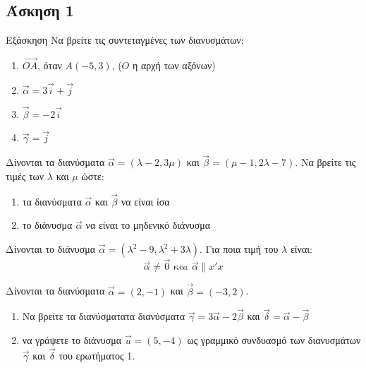 \documentclass{../../presentation}
\begin{document}
\subsection{Άσκηση 1}
\begin{frame}[label=Άσκηση1,t]{Εξάσκηση}
  Να βρείτε τις συντεταγμένες των διανυσμάτων:
  \begin{enumerate}
    \item<1-> $\overrightarrow{ΟΑ}$, όταν $Α(-5,3)$, ($Ο$ η αρχή των αξόνων)
    \item<2-> $\vec{α}=3\vec{i}+\vec{j}$
    \item<3-> $\vec{β}=-2\vec{i}$
    \item<4-> $\vec{γ}=\vec{j}$
  \end{enumerate}
\end{frame}

\begin{askisi}
  Δίνονται τα διανύσματα $\vec{α}=(λ-2,3μ)$ και $\vec{β}=(μ-1,2λ-7)$. Να βρείτε τις τιμές των $λ$ και $μ$ ώστε:
  \begin{enumerate}
    \item<1-> τα διανύσματα $\vec{α}$ και $\vec{β}$ να είναι ίσα
    \item<2-> το διάνυσμα $\vec{α}$ να είναι το μηδενικό διάνυσμα
  \end{enumerate}

\end{askisi}

\begin{askisi}
  Δίνονται το διάνυσμα $\vec{α}=(λ^2-9,λ^2+3λ)$. Για ποια τιμή του $λ$ είναι:
  $$\vec{α}\ne \vec{0} \text{ και } \vec{α}\parallel x'x$$

\end{askisi}

\begin{askisi}
  Δίνονται τα διανύσματα $\vec{α}=(2,-1)$ και $\vec{β}=(-3,2)$.
  \begin{enumerate}
    \item<1-> Να βρείτε τα διανύσματατα διανύσματα $\vec{γ}=3\vec{α}-2\vec{β}$ και $\vec{δ}=\vec{α}-\vec{β}$
    \item<2-> να γράψετε το διάνυσμα $\vec{u}=(5,-4)$ ως γραμμικό συνδυασμό των διανυσμάτων $\vec{γ}$ και $\vec{δ}$ του ερωτήματος 1.
  \end{enumerate}

\end{askisi}
\end{document}
